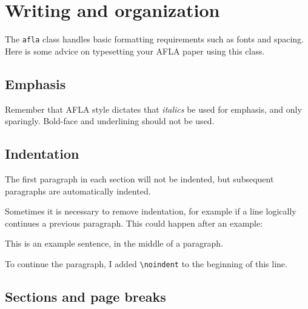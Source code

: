 \documentclass{afla}
\begin{document}
\makeatletter
\author{Michael Yoshitaka Erlewine\\
	McGill University\\
	michael.erlewine@mcgill.ca}
\author{Tobias Funke\\
	MIT Psycholinguistics\\
	funke@mit.edu}
{\@bspreauthor \@author \@bspostauthor}
\makeatother

\section{Writing and organization}

The \verb`afla` class handles basic formatting requirements such as fonts and spacing. Here is some advice on typesetting your AFLA paper using this class.

\subsection{Emphasis}

Remember that AFLA style dictates that \textit{italics} be used for emphasis, and only sparingly. Bold-face and underlining should not be used.

\subsection{Indentation}

The first paragraph in each section will not be indented, but subsequent paragraphs are automatically indented.

Sometimes it is necessary to remove indentation, for example if a line logically continues a previous paragraph. This could happen after an example:

\ex This is an example sentence, in the middle of a paragraph.
\xe
\

\noindent To continue the paragraph, I added \verb`\noindent` to the beginning of this line.

\subsection{Sections and page breaks}
\end{document}
